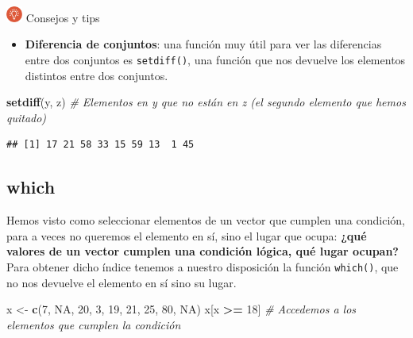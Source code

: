 \documentclass[11pt,]{book}
\newenvironment{Shaded}{\begin{snugshade}}{\end{snugshade}}
\newcommand{\CommentTok}[1]{\textcolor[rgb]{0.37,0.37,0.37}{\textit{#1}}}
\newcommand{\DecValTok}[1]{\textcolor[rgb]{0.06,0.06,0.06}{#1}}
\newcommand{\KeywordTok}[1]{\textcolor[rgb]{0.27,0.27,0.27}{\textbf{#1}}}
\newcommand{\NormalTok}[1]{#1}
\newcommand{\OperatorTok}[1]{\textcolor[rgb]{0.43,0.43,0.43}{\textbf{#1}}}
\newcommand{\OtherTok}[1]{\textcolor[rgb]{0.37,0.37,0.37}{#1}}
\newcommand{\StringTok}[1]{\textcolor[rgb]{0.5,0.5,0.5}{#1}}
\providecommand{\tightlist}{%
  \setlength{\itemsep}{0pt}\setlength{\parskip}{0pt}}
\begin{document}
~

\includegraphics[width=0.04\textwidth,height=\textheight]{img/logo_info.png} Consejos y tips

\begin{itemize}
\tightlist
\item
  \textbf{Diferencia de conjuntos}: una función muy útil para ver las diferencias entre dos conjuntos es \texttt{setdiff()}, una función que nos devuelve los elementos distintos entre dos conjuntos.
\end{itemize}

\begin{Shaded}
\begin{Highlighting}[]
\KeywordTok{setdiff}\NormalTok{(y, z) }\CommentTok{# Elementos en y que no están en z (el segundo elemento que hemos quitado)}
\end{Highlighting}
\end{Shaded}

\begin{verbatim}
## [1] 17 21 58 33 15 59 13  1 45
\end{verbatim}

\hypertarget{which}{%
\subsection{which}\label{which}}

Hemos visto como seleccionar elementos de un vector que cumplen una condición, para a veces no queremos el elemento en sí, sino el lugar que ocupa: \textbf{¿qué valores de un vector cumplen una condición lógica, qué lugar ocupan?} Para obtener dicho índice tenemos a nuestro disposición la función \texttt{which()}, que no nos devuelve el elemento en sí sino su lugar.

\begin{Shaded}
\begin{Highlighting}[]
\NormalTok{x <-}\StringTok{ }\KeywordTok{c}\NormalTok{(}\DecValTok{7}\NormalTok{, }\OtherTok{NA}\NormalTok{, }\DecValTok{20}\NormalTok{, }\DecValTok{3}\NormalTok{, }\DecValTok{19}\NormalTok{, }\DecValTok{21}\NormalTok{, }\DecValTok{25}\NormalTok{, }\DecValTok{80}\NormalTok{, }\OtherTok{NA}\NormalTok{)}
\NormalTok{x[x }\OperatorTok{>=}\StringTok{ }\DecValTok{18}\NormalTok{] }\CommentTok{# Accedemos a los elementos que cumplen la condición}
\end{Highlighting}
\end{Shaded}
\end{document}
